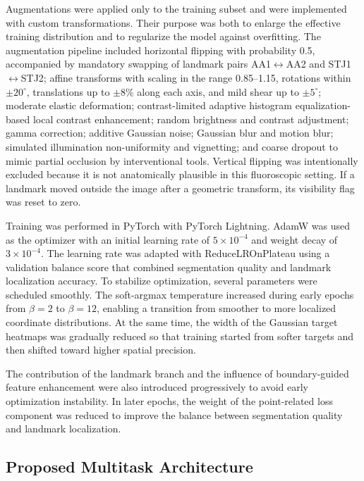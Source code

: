 \documentclass[utf8]{FrontiersinHarvard}
\begin{document}
Augmentations were applied only to the training subset and were implemented with custom transformations. Their purpose was both to enlarge the 
effective training distribution and to regularize the model against overfitting. The augmentation pipeline included horizontal flipping with 
probability 0.5, accompanied by mandatory swapping of landmark pairs AA1$\leftrightarrow$AA2 and STJ1$\leftrightarrow$STJ2; affine transforms 
with scaling in the range 0.85--1.15, rotations within $\pm 20^{\circ}$, translations up to $\pm 8$\% along each axis, and mild shear up to 
$\pm 5^{\circ}$; moderate elastic deformation; contrast-limited adaptive histogram equalization-based local contrast enhancement; random 
brightness and contrast adjustment; gamma correction; additive Gaussian noise; Gaussian blur and motion blur; simulated illumination 
non-uniformity and vignetting; and coarse dropout to mimic partial occlusion by interventional tools. Vertical flipping was intentionally 
excluded because it is not anatomically plausible in this fluoroscopic setting. If a landmark moved outside the image after a geometric 
transform, its visibility flag was reset to zero.

Training was performed in PyTorch with PyTorch Lightning. AdamW was used as the optimizer with an initial learning rate of $5 \times 10^{-4}$ 
and weight decay of $3 \times 10^{-4}$. The learning rate was adapted with ReduceLROnPlateau using a validation balance score that combined 
segmentation quality and landmark localization accuracy. To stabilize optimization, several parameters were scheduled smoothly. The soft-argmax 
temperature increased during early epochs from $\beta=2$ to $\beta=12$, enabling a transition from smoother to more localized coordinate distributions. 
At the same time, the width of the Gaussian target heatmaps was gradually reduced so that training started from softer targets and then shifted toward 
higher spatial precision.

The contribution of the landmark branch and the influence of boundary-guided feature enhancement were also introduced progressively to avoid early 
optimization instability. In later epochs, the weight of the point-related loss component was reduced to improve the balance between segmentation 
quality and landmark localization.

\subsection{Proposed Multitask Architecture}
\end{document}
